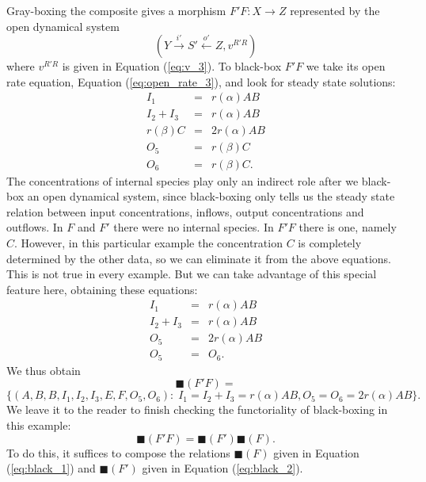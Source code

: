 \documentclass{compositionalityarticle}
\newcommand{\maps}{\colon}
\theoremstyle{plain}
\theoremstyle{remark}
\begin{document}
Gray-boxing the composite gives a morphism $F'F \maps X \to Z$ represented by the open dynamical system
\[         (Y \stackrel{i'}\longrightarrow S' \stackrel{o'}\longleftarrow Z, v^{R'R}) \]
where $v^{R'R}$ is given in Equation (\ref{eq:v_3}).   To black-box $F'F$ we take its open rate equation, Equation (\ref{eq:open_rate_3}), and look for steady state solutions:
\[
\begin{array}{rcl} 
I_1 &=& r(\alpha) AB \\
I_2 + I_3 &=& r(\alpha) AB \\ 
r(\beta) C &=& 2r(\alpha) AB  \\
O_5 &=& r(\beta) C \\
O_6 &=& r(\beta) C .
\end{array}
\]
The concentrations of internal species play only an indirect role after we black-box an open
dynamical system, since black-boxing only tells us the steady state relation between input concentrations, inflows, output concentrations and outflows.  In $F$ and $F'$ there were no internal species.  In $F'F$ there is one, namely $C$.  However, in this particular example the concentration $C$ is completely determined by the other data, so we can eliminate it from the above equations.  This is not true in every example.  But we can take advantage of this special feature here, obtaining these equations:
\[
\begin{array}{rcl} 
I_1 &=& r(\alpha) AB \\
I_2 + I_3 &=& r(\alpha) AB \\ 
O_5 &=& 2r(\alpha) AB  \\
O_5 &=& O_6 .
\end{array}
\]
We thus obtain
\begin{equation}
\label{eq:black_3}
\blacksquare(F'F)= 
\end{equation}
\[  \{ (A,B,B,I_1,I_2,I_3,E,F,O_5,O_6) : \; I_1  = I_2 + I_3 = r(\alpha) AB, O_5 = O_6 = 2 r(\alpha) AB \}   .\]
We leave it to the reader to finish checking the functoriality of black-boxing in this example:
\[         \blacksquare(F' F) = \blacksquare(F') \blacksquare(F) .\]
To do this, it suffices to compose the relations $\blacksquare(F)$ given in Equation (\ref{eq:black_1}) and $\blacksquare(F')$ given in Equation (\ref{eq:black_2}).
\end{document}
